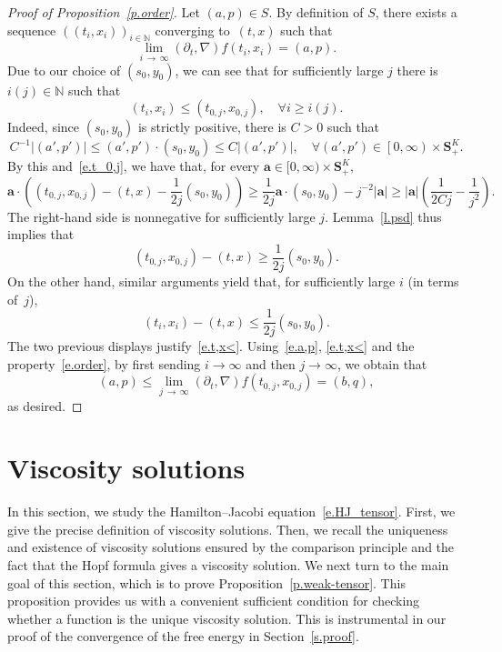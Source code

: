 \documentclass[AHL,Unicode,longabstracts,published]{cedram}
\newcommand{\N}{\mathbb{N}}
\renewcommand{\S}{\mathbf{S}}
\newcommand{\bfa}{\mathbf{a}}
\renewcommand{\leq}{\leqslant}
\renewcommand{\geq}{\geqslant}
\let\oldforall\forall
\renewcommand*{\forall}{\mathrel{\oldforall}}
\begin{document}
\begin{proof}[Proof of Proposition~\ref{p.order}]
Let $(a,p)\in S$. By definition of $S$, there exists a sequence $((t_i,x_i))_{i\in\N}$ converging to~$(t,x)$ such that
\begin{equation}\label{e.a,p}
\lim_{i\,\to\,\infty} \left(\partial_t,\nabla\right)f\left(t_i,x_i\right) = (a,p).
\end{equation}
Due to our choice of $(s_0,y_0)$, we can see that for sufficiently large $j$ there is $i(j)\in\N $ such that
\begin{equation}\label{e.t,x<}
(t_i,x_i)\leq \left(t_{0,j},x_{0,j}\right),\quad\forall i\geq i(j).
\end{equation}
Indeed, since $(s_0,y_0)$ is strictly positive, there is $C>0$ such that
\[
C^{-1}\left|\left(a',p'\right)\right|\leq \left(a',p'\right)\cdot \left(s_0,y_0\right)\leq C\left|\left(a',p'\right)\right|,\quad\forall \left(a',p'\right)\in\left[0,\infty\right)\times\S^K_+.
\]
By this and~\eqref{e.t_0,j}, we have that, for every $\bfa\in[0,\infty)\times\S^K_+$,
\[
\bfa\cdot\left(\left(t_{0,j},x_{0,j}\right)-(t,x) - \frac{1}{2j}(s_0,y_0)\right)\geq \frac{1}{2j}\bfa\cdot\left(s_0,y_0\right) - j^{-2}|\bfa|\geq |\bfa|\left(\frac{1}{2Cj}-\frac{1}{j^2}\right).
\]
The right-hand side is nonnegative for sufficiently large $j$. Lemma~\ref{l.psd} thus implies that
\[
\left(t_{0,j},x_{0,j}\right)-(t,x)\geq \frac{1}{2j}\left(s_0,y_0\right).
\]
On the other hand, similar arguments yield that, for sufficiently large $i$ (in terms of~$j$),
\[
\left(t_i,x_i\right)-(t,x) \leq \frac{1}{2j}\left(s_0,y_0\right).
\]
The two previous displays justify~\eqref{e.t,x<}. Using~\eqref{e.a,p}, \eqref{e.t,x<} and the property~\eqref{e.order}, by first sending $i\to\infty$ and then $j\to\infty$, we obtain that
\[
(a,p)\leq \lim_{j\,\to\,\infty}\left(\partial_t,\nabla\right)f\left(t_{0,j},x_{0,j}\right)=(b,q),
\]
as desired.
\end{proof}



\section{Viscosity solutions}\label{s.hj}

In this section, we study the Hamilton--Jacobi equation~\eqref{e.HJ_tensor}. First, we give the precise definition of viscosity solutions. Then, we recall the uniqueness and existence of viscosity solutions ensured by the comparison principle and the fact that the Hopf formula gives a viscosity solution. We next turn to the main goal of this section, which is to prove Proposition~\ref{p.weak-tensor}. This proposition provides us with a convenient sufficient condition for checking whether a function is the unique viscosity solution. This is instrumental in our proof of the convergence of the free energy in Section~\ref{s.proof}.
\end{document}
